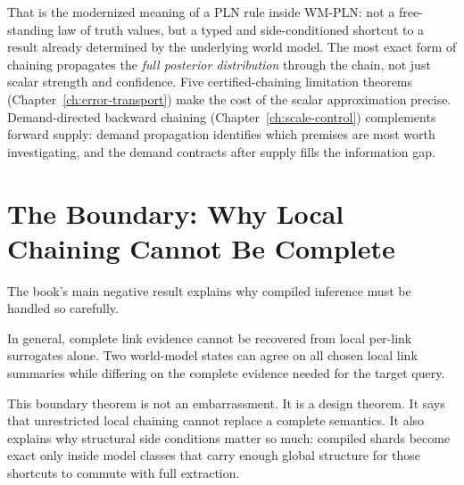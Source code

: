 \documentclass[11pt,openany]{report}
\begin{document}

That is the modernized meaning of a PLN rule inside WM-PLN:
not a free-standing law of truth values, but a typed and side-conditioned
shortcut to a result already determined by the underlying world model.
The most exact form of chaining propagates the \emph{full posterior
distribution} through the chain, not just scalar strength and
confidence.  Five certified-chaining limitation theorems
(Chapter~\ref{ch:error-transport}) make the cost of the scalar
approximation precise.  Demand-directed backward chaining
(Chapter~\ref{ch:scale-control}) complements forward supply:
demand propagation identifies which premises are most worth
investigating, and the demand contracts after supply fills the
information gap.

\section{The Boundary: Why Local Chaining Cannot Be Complete}
\label{sec:overview-boundary}

The book's main negative result explains why compiled inference must be
handled so carefully.

\begin{theorem}
\label{thm:overview-no-go}
In general, complete link evidence cannot be recovered from local per-link
surrogates alone.  Two world-model states can agree on all chosen local link
summaries while differing on the complete evidence needed for the target
query.
\end{theorem}

This boundary theorem is not an embarrassment.  It is a design theorem.  It
says that unrestricted local chaining cannot replace a complete semantics.  It
also explains why structural side conditions matter so much: compiled shards
become exact only inside model classes that carry enough global structure for
those shortcuts to commute with full extraction.
\end{document}
